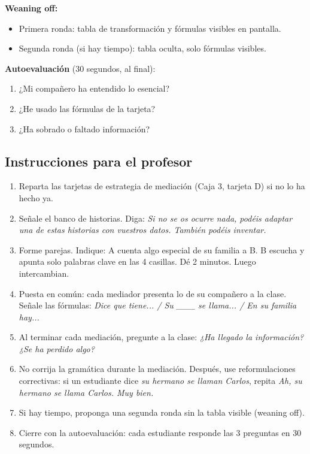 \documentclass[a4paper,11pt]{article}
\begin{document}
\vspace{0.3cm}

\noindent\textbf{Weaning off:}
\begin{itemize}[leftmargin=2cm, itemsep=2pt]
\item Primera ronda: tabla de transformación y fórmulas visibles en pantalla.
\item Segunda ronda (si hay tiempo): tabla oculta, solo fórmulas visibles.
\end{itemize}

\vspace{0.3cm}

\noindent\textbf{Autoevaluación} (30 segundos, al final):
\begin{enumerate}[leftmargin=2cm, itemsep=2pt]
\item ¿Mi compañero ha entendido lo esencial?
\item ¿He usado las fórmulas de la tarjeta?
\item ¿Ha sobrado o faltado información?
\end{enumerate}

\vspace{0.5cm}

\subsection*{Instrucciones para el profesor}

\begin{enumerate}[leftmargin=1.5cm, itemsep=4pt]
\item Reparta las tarjetas de estrategia de mediación (Caja 3, tarjeta D) si no lo ha hecho ya.
\item Señale el banco de historias. Diga: \textit{Si no se os ocurre nada, podéis adaptar una de estas historias con vuestros datos. También podéis inventar.}
\item Forme parejas. Indique: A cuenta algo especial de su familia a B. B escucha y apunta solo palabras clave en las 4 casillas. Dé 2 minutos. Luego intercambian.
\item Puesta en común: cada mediador presenta lo de su compañero a la clase. Señale las fórmulas: \textit{Dice que tiene... / Su \_\_\_ se llama... / En su familia hay...}
\item Al terminar cada mediación, pregunte a la clase: \textit{¿Ha llegado la información? ¿Se ha perdido algo?}
\item No corrija la gramática durante la mediación. Después, use reformulaciones correctivas: si un estudiante dice \textit{su hermano se llaman Carlos}, repita \textit{Ah, su hermano se llama Carlos. Muy bien.}
\item Si hay tiempo, proponga una segunda ronda sin la tabla visible (weaning off).
\item Cierre con la autoevaluación: cada estudiante responde las 3 preguntas en 30 segundos.
\end{enumerate}
\end{document}
